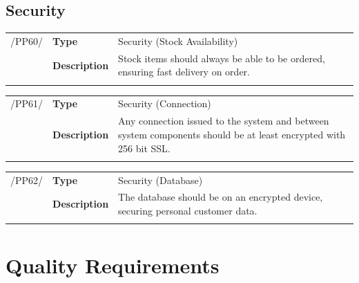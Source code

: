\documentclass[11pt,a4paper,oneside,svgnames]{report}
\begin{document}
\section{Security}
\noindent
\begin{tabular}{llp{8cm}}
\cellcolor{white}/PP60/	& \textbf{Type}			& Security (Stock Availability)\\
\cellcolor{white}		& \textbf{Description}	& Stock items should always be able to be ordered, ensuring fast delivery on order.\\
\cellcolor{white}		\hfill \\
\end{tabular}

\noindent
\begin{tabular}{llp{8cm}}
\cellcolor{white}/PP61/	& \textbf{Type}			& Security (Connection)\\
\cellcolor{white}		& \textbf{Description}	& Any connection issued to the system and between system components should be at least encrypted with 256 bit SSL.\\
\cellcolor{white}		\hfill \\
\end{tabular}

\noindent
\begin{tabular}{llp{8cm}}
\cellcolor{white}/PP62/	& \textbf{Type}			& Security (Database)\\
\cellcolor{white}		& \textbf{Description}	& The database should be on an encrypted device, securing personal customer data.\\
\cellcolor{white}		\hfill \\
\end{tabular}

\chapter{Quality Requirements}
\end{document}
